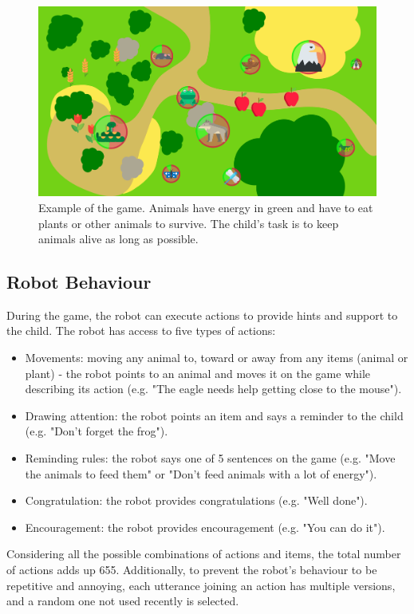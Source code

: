 \begin{figure}[ht]
	\centering
		\includegraphics[width=1\textwidth]{game.png}
		\captionsetup{width=.9\linewidth}
		\caption{Example of the game. Animals have energy in green and have to eat plants or other animals to survive. The child's task is to keep animals alive as long as possible.}
		\label{fig:tutoring_game}
\end{figure}

\subsection{Robot Behaviour}
 
During the game, the robot can execute actions to provide hints and support to the child. The robot has access to five types of actions:
\begin{itemize}
	\item Movements: moving any animal to, toward or away from any items (animal or plant) - the robot points to an animal and moves it on the game while describing its action (e.g. "The eagle needs help getting close to the mouse").
	\item Drawing attention: the robot points an item and says a reminder to the child (e.g. "Don't forget the frog").
	\item Reminding rules: the robot says one of 5 sentences on the game (e.g. "Move the animals to feed them" or "Don't feed animals with a lot of energy").
	\item Congratulation: the robot provides congratulations (e.g. "Well done").
	\item Encouragement: the robot provides encouragement (e.g. "You can do it").
\end{itemize}
Considering all the possible combinations of actions and items, the total number of actions adds up 655. Additionally, to prevent the robot's behaviour to be repetitive and annoying, each utterance joining an action has multiple versions, and a random one not used recently is selected. 

